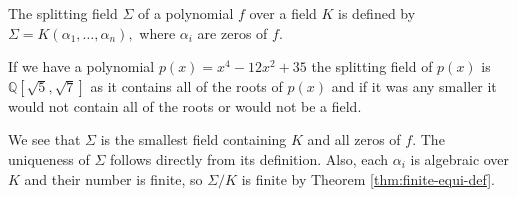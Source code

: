 \begin{definition}
    The splitting field $\Sigma$ of a polynomial $f$ over a field $K$ is defined by $\Sigma = K(\alpha_1, \ldots, \alpha_n), $ where $\alpha_i$ are zeros of $f$. 
\end{definition}
\begin{example}
	If we have a polynomial \(p(x) = x^4 - 12x^2 + 35\) the splitting field of \(p(x)\) is \(\mathbb{Q}[\sqrt{5},\sqrt{7}]\) as it contains all of the roots of \(p(x)\) and if it was any smaller it would not contain all of the roots or would not be a field.
\end{example}

We see that $\Sigma$ is the smallest field containing $K$ and all zeros of $f$. The uniqueness of $\Sigma$ follows directly from its definition. Also, each $\alpha_i$ is algebraic over $K$ and their number is finite, so $\Sigma / K$ is finite by Theorem \ref{thm:finite-equi-def}. 


%
%

